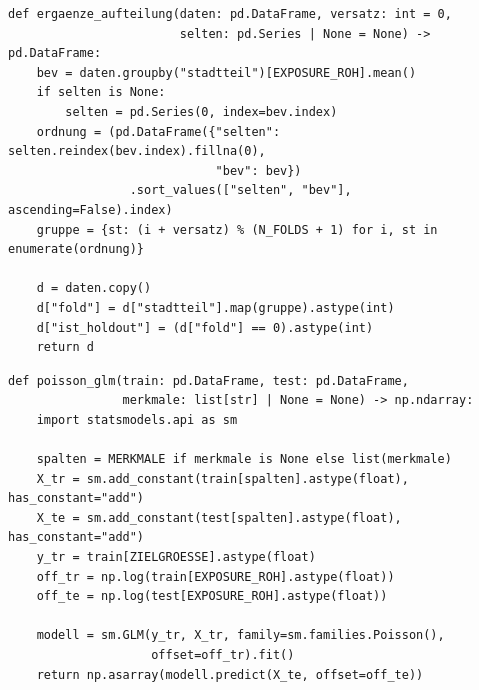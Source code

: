 \begin{lstlisting}[style=pythonstil,
  label={lst:folds},
  caption={Zuteilung der Stadtteile auf Folds und Hold-out
           (\texttt{prep/s2\_datensaetze.py}, Z.~61--89, gekürzt)}]
def ergaenze_aufteilung(daten: pd.DataFrame, versatz: int = 0,
                        selten: pd.Series | None = None) -> pd.DataFrame:
    bev = daten.groupby("stadtteil")[EXPOSURE_ROH].mean()
    if selten is None:
        selten = pd.Series(0, index=bev.index)
    ordnung = (pd.DataFrame({"selten": selten.reindex(bev.index).fillna(0),
                             "bev": bev})
                 .sort_values(["selten", "bev"], ascending=False).index)
    gruppe = {st: (i + versatz) % (N_FOLDS + 1) for i, st in enumerate(ordnung)}

    d = daten.copy()
    d["fold"] = d["stadtteil"].map(gruppe).astype(int)
    d["ist_holdout"] = (d["fold"] == 0).astype(int)
    return d
\end{lstlisting}


\begin{lstlisting}[style=pythonstil,
  label={lst:poisson},
  caption={Stufe-2-Baseline: Poisson-GLM mit Offset
           (\texttt{vorpruefung/v1\_baselines.py}, Z.~74--104, gekürzt)}]
def poisson_glm(train: pd.DataFrame, test: pd.DataFrame,
                merkmale: list[str] | None = None) -> np.ndarray:
    import statsmodels.api as sm

    spalten = MERKMALE if merkmale is None else list(merkmale)
    X_tr = sm.add_constant(train[spalten].astype(float), has_constant="add")
    X_te = sm.add_constant(test[spalten].astype(float),  has_constant="add")
    y_tr = train[ZIELGROESSE].astype(float)
    off_tr = np.log(train[EXPOSURE_ROH].astype(float))
    off_te = np.log(test[EXPOSURE_ROH].astype(float))

    modell = sm.GLM(y_tr, X_tr, family=sm.families.Poisson(),
                    offset=off_tr).fit()
    return np.asarray(modell.predict(X_te, offset=off_te))
\end{lstlisting}


